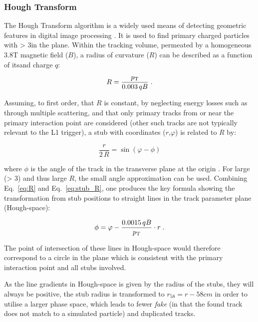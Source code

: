\subsubsection{Hough Transform}
The Hough Transform algorithm is a widely used means of detecting geometric features in digital image processing \cite{HT}. 
It is used to find primary charged particles with \pT > 3\GeV in the \rphi plane. 
Within the tracking volume, permeated by a homogeneous 3.8T magnetic field ($B$), a radius of curvature ($R$) can be described as a function of its\pT and charge $q$:

\begin{equation}
R = \frac{p_{\mathrm{T}}}{0.003\,qB} \;.
\label{eq:R}
\end{equation}

Assuming, to first order, that $R$ is constant, by neglecting energy losses such as through multiple scattering, and that only primary tracks from or near the primary interaction point are considered (other such tracks are not typically relevant to the L1 trigger), a stub with coordinates ($r$,$\varphi$) is related to $R$ by:

\begin{equation}
\frac r{2\,R} = \sin\left(\varphi-\phi\right)
\label{eq:stub_R}
\end{equation}

where $\phi$ is the angle of the track in the transverse plane at the origin \cite{markthesis}. 
For large \pT (> 3\GeV) and thus large $R$, the small angle approximation can be used. Combining Eq.~\ref{eq:R} and Eq.~\ref{eq:stub_R}, one produces the key formula showing the transformation from stub positions to straight lines in the track parameter plane (Hough-space):

\begin{equation}
\phi = \varphi - \frac{0.0015\,qB}{p_{\mathrm{T}}}\cdot r \;.
\label{eq:localHT}
\end{equation}

The point of intersection of these lines in Hough-space would therefore correspond to a circle in the \rphi plane which is consistent with the primary interaction point and all stubs involved.

As the line gradients in Hough-space is given by the radius of the stubs, they will always be positive, the stub radius is transformed to $r_{58} = r - 58cm$ in order to utilise a larger phase space, which leads to fewer \textit{fake} (in that the found track does not match to a simulated particle) and duplicated tracks.

